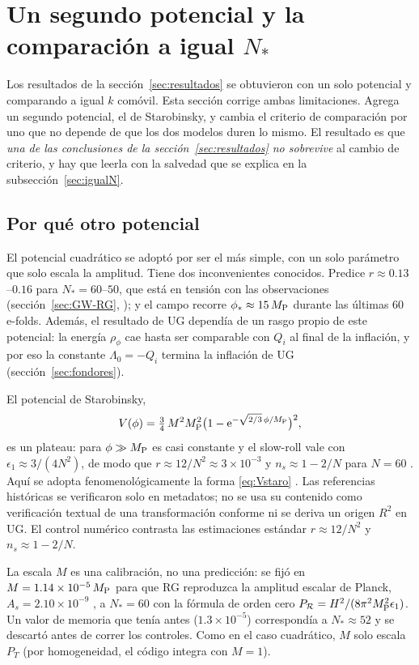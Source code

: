 \section{Un segundo potencial y la comparación a igual $N_*$}
\label{sec:potenciales}

Los resultados de la sección~\ref{sec:resultados} se obtuvieron con un solo potencial y comparando a igual $k$ comóvil. Esta sección corrige ambas limitaciones. Agrega un segundo potencial, el de Starobinsky, y cambia el criterio de comparación por uno que no depende de que los dos modelos duren lo mismo. El resultado es que \emph{una de las conclusiones de la sección~\ref{sec:resultados} no sobrevive} al cambio de criterio, y hay que leerla con la salvedad que se explica en la subsección~\ref{sec:igualN}.

\subsection{Por qué otro potencial}
\label{sec:porquestaro}

El potencial cuadrático se adoptó por ser el más simple, con un solo parámetro que solo escala la amplitud. Tiene dos inconvenientes conocidos. Predice $r\approx0.13$--$0.16$ para $N_*=60$--$50$, que está en tensión con las observaciones (sección~\ref{sec:GW-RG}, \cite{planck20,bicep21}); y el campo recorre $\phi_*\approx15\,M_{\rm P}$ durante las últimas 60 e-folds. Además, el resultado de UG dependía de un rasgo propio de este potencial: la energía $\rho_\phi$ cae hasta ser comparable con $Q_i$ al final de la inflación, y por eso la constante $\Lambda_0=-Q_i$ termina la inflación de UG (sección~\ref{sec:fondores}).

El potencial de Starobinsky,
\begin{equation}
V(\phi)=\tfrac34\,M^2M_{\rm P}^2\big(1-\mathrm e^{-\sqrt{2/3}\,\phi/M_{\rm P}}\big)^2,
\label{eq:Vstaro}
\end{equation}
es un plateau: para $\phi\gg M_{\rm P}$ es casi constante y el slow-roll vale con $\epsilon_1\approx3/(4N^2)$, de modo que $r\approx12/N^2\approx3\times10^{-3}$ y $n_s\approx1-2/N$ para $N=60$ . Aquí se adopta fenomenológicamente la forma \eqref{eq:Vstaro} . Las referencias históricas \cite{starobinsky80,defelice10} se verificaron solo en metadatos; no se usa su contenido como verificación textual de una transformación conforme ni se deriva un origen $R^2$ en UG. El control numérico contrasta las estimaciones estándar $r\approx12/N^2$ y $n_s\approx1-2/N$.

La escala $M$ es una calibración, no una predicción: se fijó en $M=1.14\times10^{-5}\,M_{\rm P}$ para que RG reproduzca la amplitud escalar de Planck, $A_s=2.10\times10^{-9}$ \cite{planck20}, a $N_*=60$ con la fórmula de orden cero $P_\mathcal{R}=H^2/(8\pi^2M_{\rm P}^2\epsilon_1)$. Un valor de memoria que tenía antes ($1.3\times10^{-5}$) correspondía a $N_*\approx52$ y se descartó antes de correr los controles. Como en el caso cuadrático, $M$ solo escala $P_T$ (por homogeneidad, el código integra con $M=1$).

